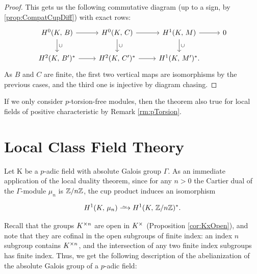 \documentclass[a4paper, oneside]{memoir}
\begin{document}
\begin{proof}
	This gets us the following commutative diagram (up to a sign, by \ref{prop:CompatCupDiff}) with exact rows:
	\[
		\begin{tikzcd}
			\H{0}{\K}{B} \ar[r] \ar[d, "\cup"] & \H{0}{\K}{C} \ar[r] \ar[d, "\cup"] & \H{1}{\K}{M} \ar[d, "\cup"] \ar[r] & 0 \\
			\H{2}{\K}{B^\prime}^* \ar[r] & \H{2}{\K}{C^\prime}^* \ar[r] & \H{1}{\K}{M^\prime}^*.
		\end{tikzcd}
	\]
	As \(B\) and \(C\) are finite, the first two vertical maps are isomorphisms by the previous cases, and the third one is injective by diagram chasing.

\end{proof}

\begin{remark}
	If we only consider $p$-torsion-free modules, then the theorem also true for local fields of positive characteristic by Remark \ref{rm:pTorsion}.
\end{remark}

\section{Local Class Field Theory}

Let K be a $p$-adic field with absolute Galois group $\Gamma$. As an immediate application of the local duality theorem, since for any $n>0$ the Cartier dual of the $\Gamma$-module $\mu_n$ is $\mathbb{Z}/n\mathbb{Z}$, the cup product induces an isomorphism


\begin{equation}\label{eq:CupIso}
	\H{1}{K}{\mu_n} \Iso \H{1}{K}{\Zn}^*.
\end{equation}

Recall that the groups $K^{\times n}$ are open in $K^\times$ (Proposition \ref{cor:KxOpen}), and note that they are cofinal in the open subgroups of finite index: an index $n$ subgroup contains $K^{\times n}$, and the intersection of any two finite index subgroups has finite index. Thus, we get the following description of the abelianization of the absolute Galois group of a $p$-adic field:
\end{document}
